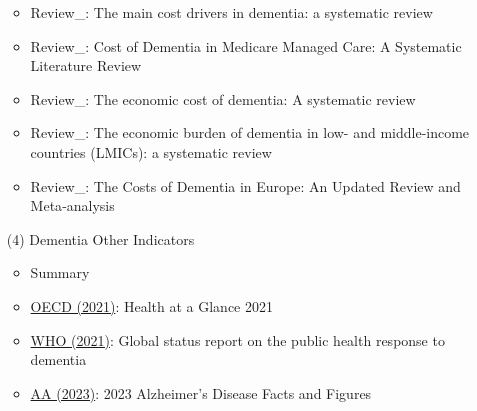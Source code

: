 \documentclass[12pt]{article}
\begin{document}
\begin{itemize}
\begin{itemize}
        \item Review\_\cite{schaller2015main}: The main cost drivers in dementia: a systematic review
        \item Review\_\cite{fishman2019cost}: Cost of Dementia in Medicare Managed Care: A Systematic Literature Review
        \item Review\_\cite{cantarero2020economic}: The economic cost of dementia: A systematic review
        \item Review\_\cite{mattap2022economic}: The economic burden of dementia in low- and middle-income countries (LMICs): a systematic review 
        \item Review\_\cite{jonsson2023costs}: The Costs of Dementia in Europe: An Updated Review and Meta‑analysis
    \end{itemize}
    \item[(4)] Dementia Other Indicators
    \begin{itemize}
        \item Summary
        \item \href{https://www.oecd-ilibrary.org/social-issues-migration-health/health-at-a-glance-2021_ae3016b9-en}{OECD (2021)}: Health at a Glance 2021
        \item \href{https://www.who.int/publications/i/item/9789240033245}{WHO (2021)}: Global status report on the public health response to dementia
        \item \href{https://www.alz.org/alzheimers-dementia/facts-figures#:~:text=More%20than%206%20million%20Americans%20of%20all%20ages%20have%20Alzheimer's,living%20with%20Alzheimer's%20in%202023.}{AA (2023)}: 2023 Alzheimer's Disease Facts and Figures
    \end{itemize}
\end{itemize}
\end{document}
